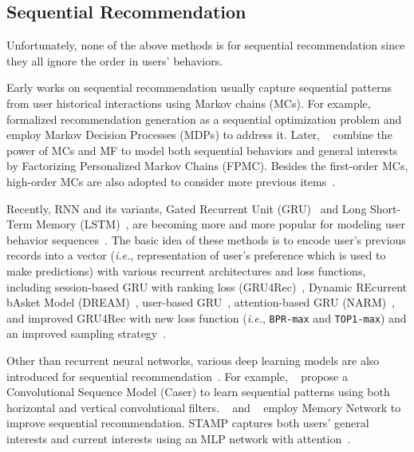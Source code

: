 \subsection{Sequential Recommendation}

Unfortunately, none of the above methods is for sequential recommendation since they all ignore the order in users' behaviors.

Early works on sequential recommendation usually capture sequential patterns from user historical interactions using Markov chains (MCs). For example, \citeauthor{Shani:jmlr2005:MRS}~\cite{Shani:jmlr2005:MRS} formalized recommendation generation as a sequential optimization problem and employ Markov Decision Processes (MDPs) to address it. Later, \citeauthor{Rendle:WWW2010:FPM}~\cite{Rendle:WWW2010:FPM} combine the power of MCs and MF to model both sequential behaviors and general interests by Factorizing Personalized Markov Chains (FPMC). Besides the first-order MCs, high-order MCs are also adopted to  consider more previous items~\cite{He:icdm16:Fusing,He:recsys2017:TR}. 

Recently, RNN and its variants, Gated Recurrent Unit (GRU)~\cite{Cho:emnlp2014:gru} and Long Short-Term Memory (LSTM)~\cite{Hochreiter:LSTM:NC1997}, are becoming more and more popular for modeling user behavior sequences~\cite{Hidasi:ICLR2016:gru4rec,Yu:sigir2016:DRM,Wu:wsdm2017:RRN,Donkers:recsys2017:SUR,Quadrana:recsys2017:PSR,Li:cikm2017:NAS,Hidasi:CIKM2018:RNN}. The basic idea of these methods is to encode user's previous records into a vector (\textit{i.e.}, representation of user's preference which is used to make predictions) with various recurrent architectures and loss functions, including session-based GRU with ranking loss (GRU4Rec)~\cite{Hidasi:ICLR2016:gru4rec}, Dynamic REcurrent bAsket Model (DREAM)~\cite{Yu:sigir2016:DRM}, user-based GRU~\cite{Donkers:recsys2017:SUR}, attention-based GRU (NARM)~\cite{Li:cikm2017:NAS}, and improved GRU4Rec with new loss function (\textit{i.e.}, \texttt{BPR-max} and \texttt{TOP1-max}) and an improved sampling strategy~\cite{Hidasi:CIKM2018:RNN}.

Other than recurrent neural networks, various deep learning models are also introduced for sequential recommendation~\cite{Chen:wsdm2018:SRU,Tang:WSDM2018:caser,Liu:kdd2018:STAMP,Kang:ICDM2018:SAS}. For example, \citeauthor{Tang:WSDM2018:caser}~\cite{Tang:WSDM2018:caser} propose a Convolutional Sequence  Model (Caser) to learn sequential patterns using both horizontal and vertical convolutional filters.
\citeauthor{Chen:wsdm2018:SRU}~\cite{Chen:wsdm2018:SRU} and \citeauthor{Huang:sigir2018:ISR}~\cite{Huang:sigir2018:ISR} employ Memory Network to improve sequential recommendation. STAMP captures both users' general interests and current interests using an MLP network with attention~\cite{Liu:kdd2018:STAMP}.

